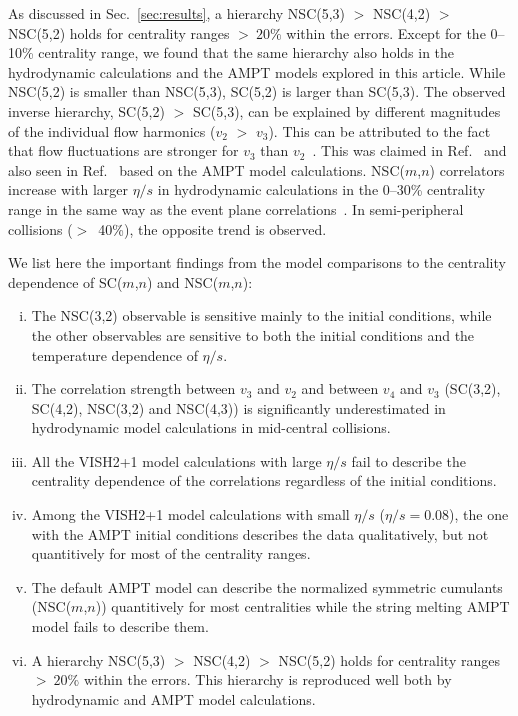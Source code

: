 As discussed in Sec.~\ref{sec:results}, a hierarchy NSC(5,3) $>$ NSC(4,2) $>$ NSC(5,2) holds for centrality ranges $>~20\%$ within the errors.
Except for the 0--10\% centrality range, we found that the same hierarchy also holds in the hydrodynamic calculations and the AMPT models explored in this article.
While NSC(5,2) is smaller than NSC(5,3), SC(5,2) is larger than SC(5,3).
The observed inverse hierarchy, SC(5,2) $>$ SC(5,3), can be explained by different magnitudes of the individual flow harmonics ($v_2$ $>$ $v_3$). 
This can be attributed to the fact that flow fluctuations are stronger for $v_3$ than $v_2$~\cite{Aad:2013xma}. This was claimed in Ref.~\cite{Zhu:2016puf} and also seen in Ref.~\cite{Bhalerao:2014xra} based on the AMPT model calculations. 
NSC($m$,$n$) correlators increase with larger $\eta/s$ in hydrodynamic calculations in the 0--30\% centrality range in the same way as the event plane correlations~\cite{Bhalerao:2013ina,Teaney:2013dta}. In semi-peripheral collisions ($>$~40\%), the opposite trend is observed.

We list here the important findings from the model comparisons to the centrality dependence of SC($m$,$n$) and NSC($m$,$n$):
\begin{enumerate}[(i)]
	\item The NSC(3,2) observable is sensitive mainly to the initial conditions, while the other observables are sensitive to both the initial conditions and the temperature dependence of $\eta/s$.
	\item The correlation strength between $v_3$ and $v_2$ and between $v_4$ and $v_3$ (SC(3,2), SC(4,2), NSC(3,2) and NSC(4,3)) is significantly underestimated in hydrodynamic model calculations in mid-central collisions.
	\item All the VISH2+1 model calculations with large $\eta/s$ fail to describe the centrality dependence of the correlations regardless of the initial conditions.
	\item Among the VISH2+1 model calculations with small $\eta/s$ ($\eta/s=0.08$), the one with the AMPT initial conditions describes the data qualitatively, but not quantitively for most of the centrality ranges.
	\item The default AMPT model can describe the normalized symmetric cumulants (NSC($m$,$n$)) quantitively for most centralities while the string melting AMPT model fails to describe them.
	\item A hierarchy NSC(5,3) $>$ NSC(4,2) $>$ NSC(5,2) holds for centrality ranges $>~20\%$ within the errors. This hierarchy is reproduced well both by hydrodynamic and AMPT model calculations.
\end{enumerate}

